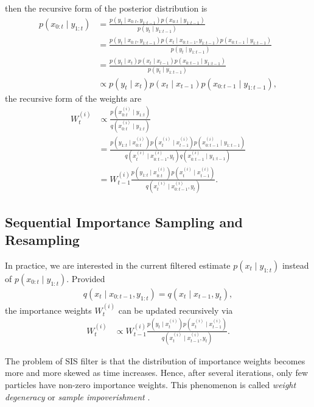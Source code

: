 then the recursive form of the posterior distribution is 
\begin{align*}
p(x_{0:t}\mid y_{1:t}) &= \frac{p(y_t \mid x_{0:t},y_{1:t-1})p(x_{0:t}\mid y_{1:t-1})}{p(y_t \mid y_{1:t-1})}\\
&= \frac{p(y_t \mid x_{0:t},y_{1:t-1}) p(x_t \mid x_{0:t-1},y_{1:t-1}) p(x_{0:t-1}\mid y_{1:t-1} ) }{p(y_t \mid y_{1:t-1})}\\
&= \frac{p(y_t \mid x_t ) p(x_t \mid x_{t-1}) p(x_{0:t-1}\mid y_{1:t-1} ) }{p(y_t \mid y_{1:t-1})}\\
&\propto p(y_t \mid x_t ) p(x_t \mid x_{t-1}) p(x_{0:t-1}\mid y_{1:t-1} ),
\end{align*}
the recursive form of the weights are
\begin{align*}
W_t^{(i)} &\propto \frac{p(x_{0:t}^{(i)}\mid y_{1:t})}{q(x_{0:t}^{(i)}\mid y_{1:t})}\\
&= \frac{ p(y_{1:t}\mid x_{0:t}^{(i)}) p(x_{t}^{(i)}\mid x_{t-1}^{(i)})  p(x_{0:t-1}^{(i)}\mid y_{1:t-1})}   { q(x_{t}^{(i)}\mid x_{0:t-1}^{(i)},y_{t})  q(x_{0:t-1}^{(i)}\mid y_{1:t-1}) } \\
&= W_{t-1}^{(i)} \frac{ p(y_{1:t}\mid x_{0:t}^{(i)}) p(x_{t}^{(i)}\mid x_{t-1}^{(i)}) }   {q(x_{t}^{(i)}\mid x_{0:t-1}^{(i)},y_{t})}.
\end{align*}

\subsection{Sequential Importance Sampling and Resampling}
 
In practice, we are interested in the current filtered estimate $p(x_t \mid y_{1:t})$ instead of $p(x_{0:t}\mid y_{1:t})$. Provided 
\begin{align*}
q(x_t \mid  x_{0:t-1},y_{1:t})=q(x_t \mid  x_{t-1},y_t ),
\end{align*}
the importance weights $W_t^{(i)}$ can be updated recursively via 
\begin{align*}
W_t^{(i)} &\propto W_{t-1}^{(i)} \frac{ p(y_t \mid x_t^{(i)}) p(x_{t}^{(i)}\mid x_{t-1}^{(i)}) }   {q(x_{t}^{(i)}\mid x_{t-1}^{(i)},y_{t})}.
\end{align*}

The problem of SIS filter is that the distribution of importance weights becomes more and more skewed as time increases. Hence, after several iterations, only few particles have non-zero importance weights. This phenomenon is called \textit{weight degeneracy} or \textit{sample impoverishment} \cite{smcmip2011}.

